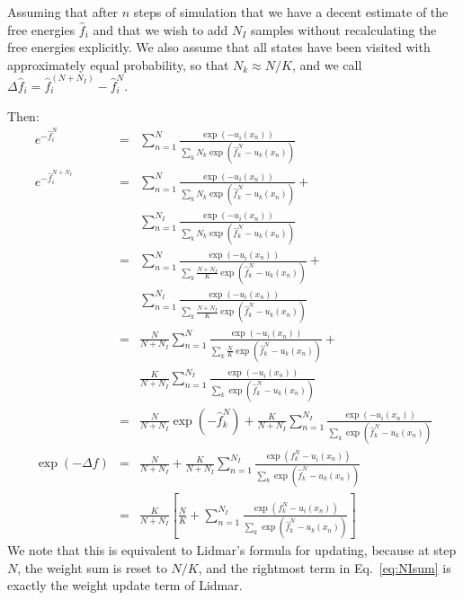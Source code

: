 \documentclass[superscriptaddress,showkeys, nofootinbib, pre, aps]{revtex4-1}
\begin{document}
Assuming that after $n$ steps of simulation that we have a decent estimate of the free energies $\hat{f}_{i}$ and that we wish to add $N_I$ samples without recalculating the free energies explicitly.  We also assume that all states have been visited with approximately equal probability, so that $N_k \approx N/K$, and we call $\Delta \hat{f}_i = \hat{f}_{i}^{(N+N_I)} - \hat{f}_{i}^{N}$.

Then:
\begin{eqnarray}
e^{-\hat{f}_{i}^{N}} &=& \sum_{n=1}^N \frac{\exp(-u_i(x_n))}{\sum\limits_k N_k \exp(\hat{f}_{k}^{N}-u_k(x_n))} \nonumber \\
e^{-\hat{f}_{i}^{N+N_I}} &=& \sum_{n=1}^{N} \frac{\exp(-u_i(x_n))}{\sum\limits_k N_k \exp(\hat{f}_{k}^{N}-u_k(x_n))} +  \nonumber \\
                          & & \sum_{n=1}^{N_I} \frac{\exp(-u_i(x_{n}))}{\sum\limits_k N_k \exp(\hat{f}_{k}^{N}-u_k(x_{n}))}  \nonumber \\
                          &=& \sum_{n=1}^{N} \frac{\exp(-u_i(x_n))}{\sum\limits_k \frac{N+N_I}{K}\exp(\hat{f}_{k}^{N}-u_k(x_n))} +  \nonumber \\
                          & & \sum_{n=1}^{N_I} \frac{\exp(-u_i(x_{n}))}{\sum\limits_k \frac{N+N_I}{K} \exp(\hat{f}_{k}^{N}-u_k(x_{n}))}  \nonumber \\
                          &=& \frac{N}{N+N_I}\sum_{n=1}^{N} \frac{\exp(-u_i(x_n))}{\sum\limits_k \frac{N}{K}\exp(\hat{f}_{k}^{N}-u_k(x_n))} +  \nonumber \\
                          & & \frac{K}{N+N_I}\sum_{n=1}^{N_I} \frac{\exp(-u_i(x_{n}))}{\sum\limits_k \exp(\hat{f}_{k}^{N}-u_k(x_{n}))}  \nonumber \\
                          &=& \frac{N}{N+N_I}\exp(-\hat{f}_{k}^{N}) + \frac{K}{N+N_I}\sum_{n=1}^{N_I} \frac{\exp(-u_i(x_{n}))}{\sum\limits_k \exp(\hat{f}_{k}^{N}-u_k(x_{n}))}  \nonumber \\
\exp(-\Delta f)           &=& \frac{N}{N+N_I} + \frac{K}{N+N_I}\sum_{n=1}^{N_I} \frac{\exp(f_{k}^{N}-u_i(x_{n}))}{\sum\limits_k \exp(\hat{f}_{k}^{N}-u_k(x_{n}))} \nonumber \\
                          &=& \frac{K}{N+N_I}\left[\frac{N}{K} + \sum_{n=1}^{N_I} \frac{\exp(f_{k}^{N}-u_i(x_{n}))}{\sum\limits_k \exp(\hat{f}_{k}^{N}-u_k(x_{n}))}\right]  \label{eq:NIsum}
\end{eqnarray}
We note that this is equivalent to Lidmar's formula for updating, because at step $N$, the weight sum is reset to $N/K$, and the rightmost term in Eq.~\ref{eq:NIsum} is exactly the weight update term of Lidmar.
\end{document}
